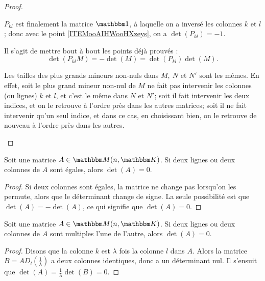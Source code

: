 \begin{proof}
\begin{subproof}
\item[\ref{ITEMooSHRQooQrqVdO}]
    \( P_{kl} \) est finalement la matrice \( \mtu \), à laquelle on a inversé les colonnes \( k \) et \( l \); donc avec le point \ref{ITEMooAIHWooHXzeys}, on a \( \det (P_{kl}) = - 1 \).
    
\item[\ref{ITEMooQXSEooMWiKbL}]
            Il s'agit de mettre bout à bout les points déjà prouvés :
            \begin{equation}
                \det(P_{kl}M)=-\det(M)=\det(P_{kl})\det(M).
            \end{equation}
\item[\ref{ITEMooRangsPermutations}]
    Les tailles des plus grands mineurs non-nuls dans \(M,\ N \) et \( N' \) sont les mêmes. En effet, soit le plus grand mineur non-nul de \( M \) ne fait pas intervenir les colonnes (ou lignes) \( k \) et \( l \), et c'est le même dans \( N \) et \( N' \); soit il fait intervenir les deux indices, et on le retrouve à l'ordre près dans les autres matrices; soit il ne fait intervenir qu'un seul indice, et dans ce cas, en choisissant bien, on le retrouve de nouveau à l'ordre près dans les autres.
    \end{subproof}
\end{proof}

\begin{corollary}        \label{CORooAZFCooSYINvBl}
    Soit une matrice \( A\in \eM(n,\eK)\). Si deux lignes ou deux colonnes de \( A\) sont égales, alors \( \det(A)=0\).
\end{corollary}

\begin{proof}
    Si deux colonnes sont égales, la matrice ne change pas lorsqu'on les permute, alors que le déterminant change de signe. La seule possibilité est que \( \det(A)=-\det(A)\), ce qui signifie que \( \det(A)=0\).
\end{proof}

\begin{corollary}      
    Soit une matrice \( A\in \eM(n,\eK)\). Si deux lignes ou deux colonnes de \( A\) sont multiples l'une de l'autre, alors \( \det(A)=0\).
\end{corollary}

\begin{proof}
    Disons que la colonne \( k \) est \( \lambda \) fois la colonne \( l \) dans \( A \). Alors la matrice \( B = A D_l(\frac 1 \lambda) \) a deux colonnes identiques, donc a un déterminant nul. Il s'ensuit que \( \det (A) = \frac 1 \lambda \det(B) = 0. \)
\end{proof}

